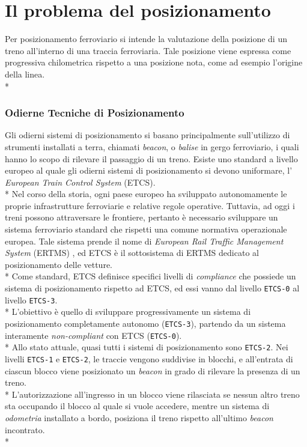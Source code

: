\section{Il problema del posizionamento}
Per posizionamento ferroviario si intende la valutazione della posizione di un treno all'interno di una traccia ferroviaria. Tale posizione viene espressa come progressiva chilometrica rispetto a una posizione nota, come ad esempio l'origine della linea. \cite{trainpositioning}\\*
\subsubsection{Odierne Tecniche di Posizionamento}
Gli odierni sistemi di posizionamento si basano principalmente sull'utilizzo di strumenti installati a terra, chiamati \emph{beacon}, o \emph{balise} in gergo ferroviario, i quali hanno lo scopo di rilevare il passaggio di un treno.\cite{tecnicheodierne}
Esiste uno standard a livello europeo al quale gli odierni sistemi di posizionamento si devono uniformare, l' \emph{European Train Control System} (ETCS).\\*
Nel corso della storia, ogni paese europeo ha sviluppato autonomamente le proprie infrastrutture ferroviarie e relative regole operative. Tuttavia, ad oggi i treni possono attraversare le frontiere, pertanto \`e necessario sviluppare un sistema ferroviario standard che rispetti una comune normativa operazionale europea. Tale sistema prende il nome di \emph{European Rail Traffic Management System} (ERTMS) \cite{ertms}, ed ETCS \`e il sottosistema di ERTMS dedicato al posizionamento delle vetture.\\*
Come standard, ETCS definisce specifici livelli di \emph{compliance} che possiede un sistema di posizionamento rispetto ad ETCS, ed essi vanno dal livello \texttt{ETCS-0} al livello \texttt{ETCS-3}. \cite{svolta}
\\*
L'obiettivo \`e quello di sviluppare progressivamente un sistema di posizionamento completamente autonomo (\texttt{ETCS-3}), partendo da un sistema interamente \emph{non-compliant} con ETCS (\texttt{ETCS-0}).
\\*
Allo stato attuale, quasi tutti i sistemi di posizionamento sono \texttt{ETCS-2}. Nei livelli \texttt{ETCS-1} e \texttt{ETCS-2}, le traccie vengono suddivise in blocchi, e all'entrata di ciascun blocco viene posizionato un \emph{beacon} in grado di rilevare la presenza di un treno.\\*
L'autorizzazione all'ingresso in un blocco viene rilasciata se nessun altro treno sta occupando il blocco al quale si vuole accedere, mentre un sistema di \emph{odometria} installato a bordo, posiziona il treno rispetto all'ultimo \emph{beacon} incontrato.\\*
